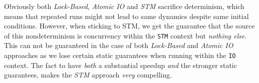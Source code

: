 Obviously both \textit{Lock-Based}, \textit{Atomic IO} and \textit{STM} sacrifice determinism, which means that repeated runs might not lead to same dynamics despite same initial conditions. However, when sticking to STM, we get the guarantee that the source of this nondeterminism is concurrency within the \texttt{STM} context but \textit{nothing else}. This can not be guaranteed in the case of both \textit{Lock-Based} and \textit{Atomic IO} approaches as we lose certain static guarantees when running within the \texttt{IO} context. The fact to have \textit{both} a substantial speedup \textit{and} the stronger static guarantees, makes the \textit{STM} approach \textit{very} compelling.